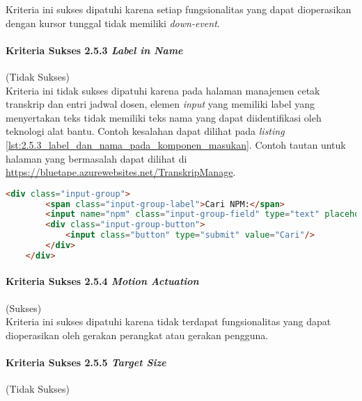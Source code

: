 Kriteria ini sukses dipatuhi karena setiap fungsionalitas yang dapat dioperasikan dengan kursor tunggal tidak memiliki \textit{down-event}.

\paragraph{Kriteria Sukses 2.5.3 \textit{Label in Name}}
\label{par:kepatuhan_bluetape_kriteria_sukses_2.5.3}
(Tidak Sukses)\\

Kriteria ini tidak sukses dipatuhi karena pada halaman manajemen cetak transkrip dan entri jadwal dosen, elemen \textit{input} yang memiliki label yang menyertakan teks tidak memiliki teks nama yang dapat diidentifikasi oleh teknologi alat bantu. Contoh kesalahan dapat dilihat pada \textit{listing} \ref{lst:2.5.3_label_dan_nama_pada_komponen_masukan}. Contoh tautan untuk halaman yang bermasalah dapat dilihat di \url{https://bluetape.azurewebsites.net/TranskripManage}.

\begin{lstlisting}[frame=single, label={lst:2.5.3_label_dan_nama_pada_komponen_masukan}, language=HTML, caption=Pelanggaran Kriteria Sukses 2.5.3 pada Halaman Manajemen Cetak Transkrip]
    <div class="input-group">
        <span class="input-group-label">Cari NPM:</span>
        <input name="npm" class="input-group-field" type="text" placeholder="2013730013" maxlength="10" minlength="10"<?= $npmQuery === NULL ? '' : " value='$npmQuery'" ?>/>
        <div class="input-group-button">
            <input class="button" type="submit" value="Cari"/>
        </div>
    </div>
\end{lstlisting}

\paragraph{Kriteria Sukses 2.5.4 \textit{Motion Actuation}}
\label{par:kepatuhan_bluetape_kriteria_sukses_2.5.4}
(Sukses)\\

Kriteria ini sukses dipatuhi karena tidak terdapat fungsionalitas yang dapat dioperasikan oleh gerakan perangkat atau gerakan pengguna.

\paragraph{Kriteria Sukses 2.5.5 \textit{Target Size}}
\label{par:kepatuhan_bluetape_kriteria_sukses_2.5.5}
(Tidak Sukses)\\

